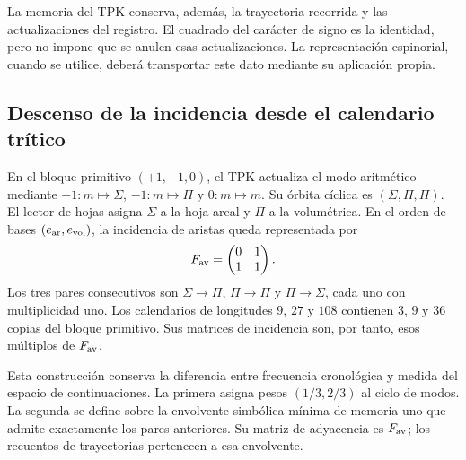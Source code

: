La memoria del TPK conserva, además, la trayectoria recorrida y las actualizaciones
del registro. El cuadrado del carácter de signo es la identidad, pero no impone
que se anulen esas actualizaciones. La representación espinorial, cuando se
utilice, deberá transportar este dato mediante su aplicación propia.

\subsection{Descenso de la incidencia desde el calendario trítico}

En el bloque primitivo $(+1,-1,0)$, el TPK actualiza el modo aritmético mediante
$+1:m\mapsto\Sigma$, $-1:m\mapsto\Pi$ y $0:m\mapsto m$. Su órbita cíclica
es $(\Sigma,\Pi,\Pi)$. El lector de hojas asigna $\Sigma$ a la hoja areal y
$\Pi$ a la volumétrica. En el orden de bases $(e_{\rm ar},e_{\rm vol})$, la
incidencia de aristas queda representada por
\begin{equation}
 F_{\rm av}=\begin{pmatrix}0&1\\1&1\end{pmatrix}.
 \label{iii:iii:eq:fav}
\end{equation}
Los tres pares consecutivos son $\Sigma\to\Pi$, $\Pi\to\Pi$ y
$\Pi\to\Sigma$, cada uno con multiplicidad uno. Los calendarios de longitudes
$9$, $27$ y $108$ contienen $3$, $9$ y $36$ copias del bloque primitivo. Sus
matrices de incidencia son, por tanto, esos múltiplos de $F_{\rm av}$.

Esta construcción conserva la diferencia entre frecuencia cronológica y medida
del espacio de continuaciones. La primera asigna pesos $(1/3,2/3)$ al ciclo
de modos. La segunda se define sobre la envolvente simbólica mínima de memoria
uno que admite exactamente los pares anteriores. Su matriz de adyacencia es
$F_{\rm av}$; los recuentos de trayectorias pertenecen a esa envolvente.

